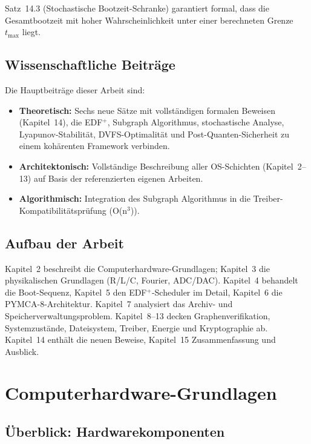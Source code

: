 ﻿\documentclass[a4paper,12pt]{scrreprt}
\theoremstyle{definition}
\begin{document}
	Satz~14.3 (Stochastische Bootzeit-Schranke) garantiert formal, dass die
	Gesamtbootzeit mit hoher Wahrscheinlichkeit unter einer berechneten Grenze
	$t_{\max}$ liegt.
	
	\section{Wissenschaftliche Beiträge}
	
	Die Hauptbeiträge dieser Arbeit sind:
	
	\begin{itemize}
		\item \textbf{Theoretisch:} Sechs neue Sätze mit vollständigen formalen Beweisen
		(Kapitel~14), die EDF$^+$, Subgraph Algorithmus, stochastische Analyse,
		Lyapunov-Stabilität, DVFS-Optimalität und Post-Quanten-Sicherheit
		zu einem kohärenten Framework verbinden.
		\item \textbf{Architektonisch:} Vollständige Beschreibung aller OS-Schichten
		(Kapitel~2--13) auf Basis der referenzierten eigenen Arbeiten.
		\item \textbf{Algorithmisch:} Integration des Subgraph Algorithmus
		\cite{Epp2026subgraph} in die Treiber-Kompatibi\-litätsprüfung (O(n$^3$)).
	\end{itemize}
	
	\section{Aufbau der Arbeit}
	
	Kapitel~2 beschreibt die Computerhardware-Grundlagen; Kapitel~3 die
	physikalischen Grundlagen (R/L/C, Fourier, ADC/DAC). Kapitel~4 behandelt die
	Boot-Sequenz, Kapitel~5 den EDF$^+$-Scheduler im Detail,
	Kapitel~6 die PYMCA-8-Architektur. Kapitel~7 analysiert das Archiv- und
	Speicherverwaltungsproblem. Kapitel~8--13 decken Graphenverifikation,
	Systemzustände, Dateisystem, Treiber, Energie und Kryptographie ab.
	Kapitel~14 enthält die neuen Beweise, Kapitel~15 Zusammenfassung und Ausblick.
	
	\chapter{Computerhardware-Grundlagen}
	
	\section{Überblick: Hardwarekomponenten}
	
\end{document}
